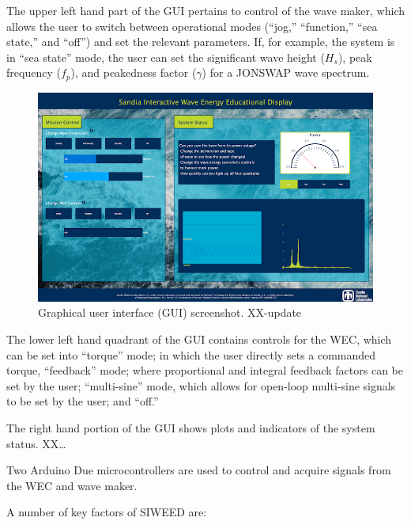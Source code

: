 \documentclass[11pt, letterpaper]{article}
\begin{document}
The upper left hand part of the GUI pertains to control of the wave maker, which allows the user to switch between operational modes (``jog,'' ``function,'' ``sea state,'' and ``off'') and set the relevant parameters.
If, for example, the system is in ``sea state'' mode, the user can set the significant wave height ($H_s$), peak frequency ($f_p$), and peakedness factor ($\gamma$) for a JONSWAP wave spectrum.

\begin{figure}[tb]
  \centering
  \includegraphics[width=1\textwidth]{diagrams/siweed_guiScreenShot.png}
  \caption{Graphical user interface (GUI) screenshot. XX-update}
  \label{fig:siweed_guiScreenShot}
\end{figure}

The lower left hand quadrant of the GUI contains controls for the WEC, which can be set into ``torque'' mode; in which the user directly sets a commanded torque, ``feedback'' mode; where proportional and integral feedback factors can be set by the user; ``multi-sine'' mode, which allows for open-loop multi-sine signals to be set by the user; and ``off.''

The right hand portion of the GUI shows plots and indicators of the system status.
XX\dots{}

Two Arduino Due microcontrollers are used to control and acquire signals from the WEC and wave maker.

A number of key factors of SIWEED are:
\end{document}
